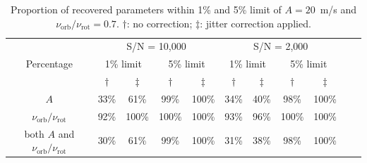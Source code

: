 \begin{table}[h!]
\centering
\begin{tabular}{|c|c|c|c|c|c|c|c|c|ll}
\cline{1-9}
\multirow{3}{*}{Percentage} & \multicolumn{4}{c|}{S/N = 10,000}                        & \multicolumn{4}{c|}{S/N = 2,000}                         &  &  \\ \cline{2-9}
                            & \multicolumn{2}{c|}{1\% limit} & \multicolumn{2}{c|}{5\% limit} & \multicolumn{2}{c|}{1\% limit} & \multicolumn{2}{c|}{5\% limit} &  &  \\ \cline{2-9}
                            				& $\dagger$     & $\ddagger$   & $\dagger$           & $\ddagger$           & $\dagger$           & $\ddagger$          & $\dagger$            & $\ddagger$          &  &  \\ \cline{1-9}
$A$                         					& 33\%            & 61\%           & 99\%            & 100\%            & 34\%            & 40\%           & 98\%             & 100\%           &  &  \\ \cline{1-9}
$\nu_\text{orb}/\nu_\text{rot}$              	& 92\%            & 100\%           & 100\%            & 100\%            & 93\%            & 96\%           & 100\%             & 100\%           &  &  \\ \cline{1-9}
both $A$ and $\nu_\text{orb}/\nu_\text{rot}$    & 30\%             & 61\%           & 99\%            & 100\%            & 31\%            & 38\%           & 98\%             & 100\%           &  &  \\ \cline{1-9}
\end{tabular}
\caption{Proportion of recovered parameters within 1\% and 5\% limit of $A = 20$~m/s and $\nu_\text{orb}/\nu_\text{rot} =0.7$. $\dagger$: no correction; $\ddagger$: jitter correction applied.}
\label{table:a=20}
\end{table}



\FloatBarrier

